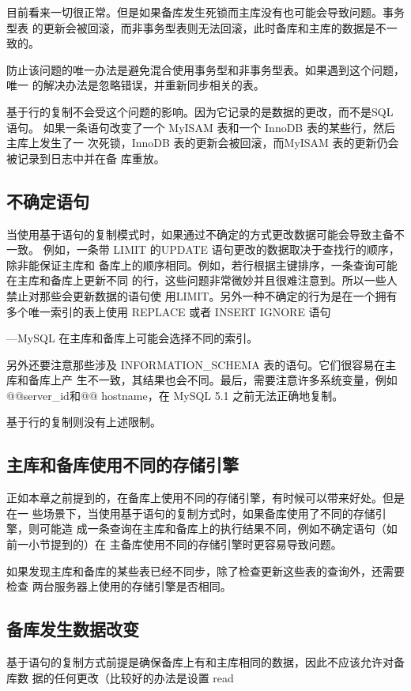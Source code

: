 目前看来一切很正常。但是如果备库发生死锁而主库没有也可能会导致问题。事务型表
的更新会被回滚，而非事务型表则无法回滚，此时备库和主库的数据是不一致的。

防止该问题的唯一办法是避免混合使用事务型和非事务型表。如果遇到这个问题，唯一
的解决办法是忽略错误，并重新同步相关的表。

基于行的复制不会受这个问题的影响。因为它记录的是数据的更改，而不是SQL 语句。
如果一条语句改变了一个 MyISAM 表和一个 InnoDB 表的某些行，然后主库上发生了一
次死锁，InnoDB 表的更新会被回滚，而MyISAM 表的更新仍会被记录到日志中并在备
库重放。

\subsection{不确定语句}
当使用基于语句的复制模式时，如果通过不确定的方式更改数据可能会导致主备不一致。
例如，一条带 LIMIT 的UPDATE 语句更改的数据取决于查找行的顺序，除非能保证主库和
备库上的顺序相同。例如，若行根据主键排序，一条查询可能在主库和备库上更新不同
的行，这些问题非常微妙并且很难注意到。所以一些人禁止对那些会更新数据的语句使
用LIMIT。另外一种不确定的行为是在一个拥有多个唯一索引的表上使用 REPLACE 或者
INSERT IGNORE 语句

—MySQL 在主库和备库上可能会选择不同的索引。

另外还要注意那些涉及 INFORMATION\_SCHEMA 表的语句。它们很容易在主库和备库上产
生不一致，其结果也会不同。最后，需要注意许多系统变量，例如 @@server\_id和@@
hostname，在 MySQL 5.1 之前无法正确地复制。

基于行的复制则没有上述限制。

\subsection{主库和备库使用不同的存储引擎}
正如本章之前提到的，在备库上使用不同的存储引擎，有时候可以带来好处。但是在一
些场景下，当使用基于语句的复制方式时，如果备库使用了不同的存储引擎，则可能造
成一条查询在主库和备库上的执行结果不同，例如不确定语句（如前一小节提到的）在
主备库使用不同的存储引擎时更容易导致问题。

如果发现主库和备库的某些表已经不同步，除了检查更新这些表的查询外，还需要检查
两台服务器上使用的存储引擎是否相同。

\subsection{备库发生数据改变}
基于语句的复制方式前提是确保备库上有和主库相同的数据，因此不应该允许对备库数
据的任何更改（比较好的办法是设置 read

